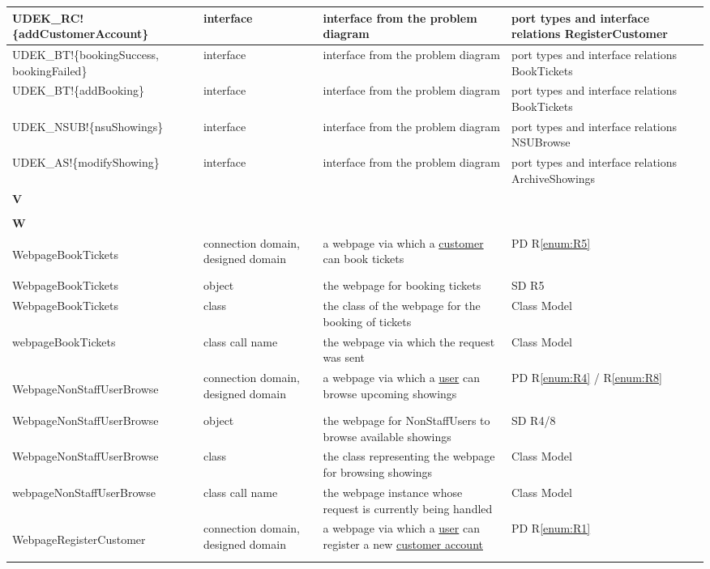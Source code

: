 \documentclass[a4paper,10pt,titlepage,bibtotoc,bibtotocnumbered]{scrreprt}
\begin{document}
\begin{longtable}{|p{.4\linewidth}|p{.2\linewidth}|p{.2\linewidth}|p{.2\linewidth}|}
\hline
UDEK\_RC!\{addCustomerAccount\} & interface & interface from the problem diagram & port types and interface relations RegisterCustomer\\
\hline
UDEK\_BT!\{bookingSuccess, bookingFailed\} & interface & interface from the problem diagram & port types and interface relations BookTickets\\
\hline
UDEK\_BT!\{addBooking\} & interface & interface from the problem diagram & port types and interface relations BookTickets\\
\hline
UDEK\_NSUB!\{nsuShowings\} & interface & interface from the problem diagram & port types and interface relations NSUBrowse\\
\hline
UDEK\_AS!\{modifyShowing\} & interface & interface from the problem diagram & port types and interface relations ArchiveShowings\\
\hline
\multicolumn{4}{|l|}{\textbf{V}}\\
\hline
&  &  & \\
\hline
\multicolumn{4}{|l|}{\textbf{W}}\\
\hline
\hypertarget{glossary:WebpageBookTickets}{WebpageBookTickets} & connection domain, designed domain & a webpage via which a \hyperlink{glossary:Customer}{customer} can book tickets & PD R\ref{enum:R5}\\
\hline
WebpageBookTickets & object & the webpage for booking tickets & SD R5\\
\hline
WebpageBookTickets & class & the class of the webpage for the booking of tickets & Class Model\\
\hline
webpageBookTickets & class call name & the webpage via which the request was sent & Class Model\\
\hline
\hypertarget{glossary:WebpageNonStaffUserBrowse}{WebpageNonStaffUserBrowse} & connection domain, designed domain & a webpage via which a \hyperlink{glossary:NonStaffUser}{user} can browse upcoming showings & PD R\ref{enum:R4} / R\ref{enum:R8}\\
\hline
WebpageNonStaffUserBrowse & object & the webpage for NonStaffUsers to browse available showings & SD R4/8\\
\hline
WebpageNonStaffUserBrowse & class & the class representing the webpage for browsing showings & Class Model\\
\hline
webpageNonStaffUserBrowse & class call name & the webpage instance whose request is currently being handled & Class Model\\
\hline
\hypertarget{glossary:WebpageRegisterCustomer}{WebpageRegisterCustomer} & connection domain, designed domain & a webpage via which a \hyperlink{glossary:User}{user} can register a new \hyperlink{glossary:Customer}{customer account} & PD R\ref{enum:R1}\\

\end{longtable}
\end{document}
